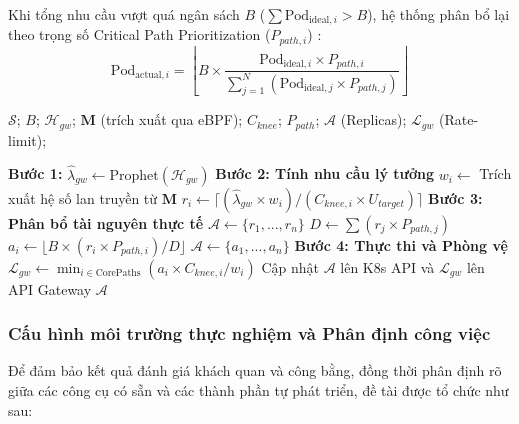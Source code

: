 \documentclass[14pt]{article}
\begin{document}
Khi tổng nhu cầu vượt quá ngân sách $B$ ($\sum \mathrm{Pod}_{\mathrm{ideal}, i} > B$), hệ thống phân bổ lại theo trọng số Critical Path Prioritization ($P_{path, i}$) \cite{xie2024pbscaler}:
\begin{equation}
    \mathrm{Pod}_{\mathrm{actual}, i} = \left\lfloor B \times \frac{\mathrm{Pod}_{\mathrm{ideal}, i} \times P_{path, i}}{\sum_{j=1}^{N} (\mathrm{Pod}_{\mathrm{ideal}, j} \times P_{path, j})} \right\rfloor
\end{equation}

\begin{algorithm}[H]
\caption{FlowSmart Global Scaling Strategy}
\label{alg:flowsmart}
\begin{algorithmic}[1]
\renewcommand{\algorithmicrequire}{\textbf{Input:}}
\renewcommand{\algorithmicensure}{\textbf{Output:}}
\REQUIRE $\mathcal{S}$; $B$; $\mathcal{H}_{gw}$; $\mathbf{M}$ (trích xuất qua eBPF); $C_{knee}$; $P_{path}$;
\ENSURE $\mathcal{A}$ (Replicas); $\mathcal{L}_{gw}$ (Rate-limit);

\STATE \textbf{Bước 1:} $\hat{\lambda}_{gw} \leftarrow \text{Prophet}(\mathcal{H}_{gw})$ 
\STATE \textbf{Bước 2: Tính nhu cầu lý tưởng}
    \STATE $w_i \leftarrow$ Trích xuất hệ số lan truyền từ $\mathbf{M}$
    \STATE $r_i \leftarrow \lceil (\hat{\lambda}_{gw} \times w_i) / (C_{knee,i} \times U_{target}) \rceil$
\ENDFOR
\STATE \textbf{Bước 3: Phân bổ tài nguyên thực tế}
    \STATE $\mathcal{A} \leftarrow \{r_1, ..., r_n\}$
\ELSE
    \STATE $D \leftarrow \sum (r_j \times P_{path,j})$
        \STATE $a_i \leftarrow \lfloor B \times (r_i \times P_{path,i}) / D \rfloor$
    \ENDFOR
    \STATE $\mathcal{A} \leftarrow \{a_1, ..., a_n\}$
\ENDIF
\STATE \textbf{Bước 4: Thực thi và Phòng vệ}
\STATE $\mathcal{L}_{gw} \leftarrow \min_{i \in \text{CorePaths}} (a_i \times C_{knee,i} / w_i)$ 
\STATE Cập nhật $\mathcal{A}$ lên K8s API và $\mathcal{L}_{gw}$ lên API Gateway
\RETURN $\mathcal{A}$
\end{algorithmic}
\end{algorithm}

\subsubsection{Cấu hình môi trường thực nghiệm và Phân định công việc}

Để đảm bảo kết quả đánh giá khách quan và công bằng, đồng thời phân định rõ giữa các công cụ có sẵn và các thành phần tự phát triển, đề tài được tổ chức như sau:
\end{document}
